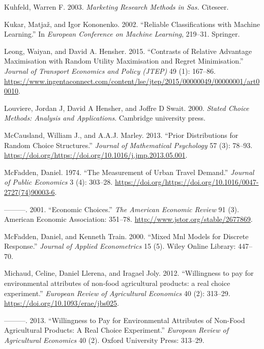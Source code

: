 \documentclass[12pt,]{article}
\begin{document}
\leavevmode\hypertarget{ref-kuhfeld2003marketing}{}%
Kuhfeld, Warren F. 2003. \emph{Marketing Research Methods in Sas.}
Citeseer.

\leavevmode\hypertarget{ref-kukar2002re}{}%
Kukar, Matjaž, and Igor Kononenko. 2002. ``Reliable Classifications with
Machine Learning.'' In \emph{European Conference on Machine Learning},
219--31. Springer.

\leavevmode\hypertarget{ref-leong2015ram}{}%
Leong, Waiyan, and David A. Hensher. 2015. ``Contrasts of Relative
Advantage Maximisation with Random Utility Maximisation and Regret
Minimisation.'' \emph{Journal of Transport Economics and Policy (JTEP)}
49 (1): 167--86.
\url{https://www.ingentaconnect.com/content/lse/jtep/2015/00000049/00000001/art00010}.

\leavevmode\hypertarget{ref-louviere2000stated}{}%
Louviere, Jordan J, David A Hensher, and Joffre D Swait. 2000.
\emph{Stated Choice Methods: Analysis and Applications}. Cambridge
university press.

\leavevmode\hypertarget{ref-mccausland2013pd}{}%
McCausland, William J., and A.A.J. Marley. 2013. ``Prior Distributions
for Random Choice Structures.'' \emph{Journal of Mathematical
Psychology} 57 (3): 78--93.
\url{https://doi.org/https://doi.org/10.1016/j.jmp.2013.05.001}.

\leavevmode\hypertarget{ref-mcfadden1974utd}{}%
McFadden, Daniel. 1974. ``The Measurement of Urban Travel Demand.''
\emph{Journal of Public Economics} 3 (4): 303--28.
\url{https://doi.org/https://doi.org/10.1016/0047-2727(74)90003-6}.

\leavevmode\hypertarget{ref-mcfadden2001ec}{}%
---------. 2001. ``Economic Choices.'' \emph{The American Economic
Review} 91 (3). American Economic Association: 351--78.
\url{http://www.jstor.org/stable/2677869}.

\leavevmode\hypertarget{ref-mcfadden2000mmnl}{}%
McFadden, Daniel, and Kenneth Train. 2000. ``Mixed Mnl Models for
Discrete Response.'' \emph{Journal of Applied Econometrics} 15 (5).
Wiley Online Library: 447--70.

\leavevmode\hypertarget{ref-llerena2013rose}{}%
Michaud, Celine, Daniel Llerena, and Iragael Joly. 2012. ``Willingness
to pay for environmental attributes of non-food agricultural products: a
real choice experiment.'' \emph{European Review of Agricultural
Economics} 40 (2): 313--29. \url{https://doi.org/10.1093/erae/jbs025}.

\leavevmode\hypertarget{ref-michaud2013willingness}{}%
---------. 2013. ``Willingness to Pay for Environmental Attributes of
Non-Food Agricultural Products: A Real Choice Experiment.''
\emph{European Review of Agricultural Economics} 40 (2). Oxford
University Press: 313--29.
\end{document}
